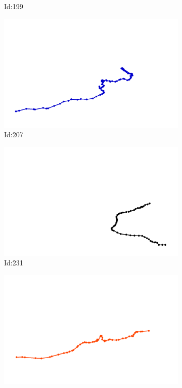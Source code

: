 \documentclass[12pt,twoside]{report}
\begin{document}
\begin{figure}
\begin{subfigure}[b]{0.20\textwidth}
\caption{Id:199}
\end{subfigure}
\begin{subfigure}[b]{0.20\textwidth}
\centering
\includegraphics[width=\textwidth]{../trajectories/207.png}
\caption{Id:207}
\end{subfigure}
\begin{subfigure}[b]{0.20\textwidth}
\centering
\includegraphics[width=\textwidth]{../trajectories/231.png}
\caption{Id:231}
\end{subfigure}
\begin{subfigure}[b]{0.20\textwidth}
\centering
\includegraphics[width=\textwidth]{../trajectories/251.png}

\end{subfigure}
\end{figure}
\end{document}

